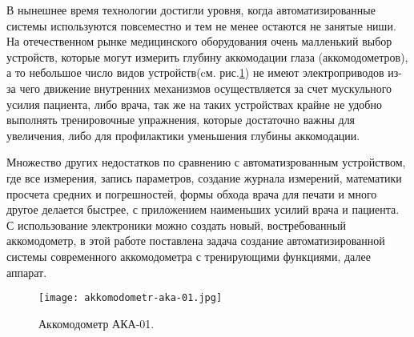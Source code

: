 В нынешнее время технологии достигли уровня, когда автоматизированные системы используются повсеместно и тем не менее остаются не занятые ниши. На отечественном рынке медицинского оборудования очень малленький выбор устройств, которые могут измерить глубину аккомодации глаза (аккомодометров), а то небольшое число видов устройств(cм. рис.\ref{fig:aka-01}) не имеют электроприводов из-за чего движение внутренних механизмов осуществляется за счет мускульного усилия пациента, либо врача, так же на таких устройствах крайне не удобно выполнять тренировочные упражнения, которые достаточно важны для увеличения, либо для профилактики уменьшения глубины аккомодации.

Множество других недостатков по сравнению с автоматизрованным устройством, где все измерения, запись параметров, создание журнала измерений, математики просчета средних и погрешностей, формы обхода врача для печати и много другое делается быстрее, с приложением наименьших усилий врача и пациента. С использование электроники можно создать новый, востребованный аккомодометр, в этой работе поставлена задача создание автоматизированной системы современного аккомодометра с тренирующими функциями, далее аппарат.
\begin{figure}[ht]
\centering
    \centering
    \texttt{[image: akkomodometr-aka-01.jpg]}
    \caption{Аккомодометр АКА-01.}
    \label{fig:aka-01}
\end{figure}	